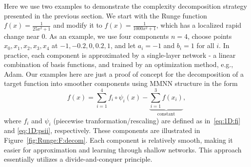 \documentclass[review,hidelinks,onefignum,onetabnum]{siamart250211}
\begin{document}
Here we use two examples to demonstrate the complexity decomposition strategy presented in the previous section. We start with the Runge function $f(x) = \frac{1}{25x^2+1}$ and modify it to $f(x) = \frac{1}{1000x^2+1}$, which has a localized rapid change near $0$. As an example, we use four components $n=4$, choose points $x_0, x_1, x_2, x_3, x_4$ at $-1, -0.2, 0, 0.2, 1$, and let $a_i = -1$ and $b_i = 1$ for all 
 $i$. In practice, each component is approximated by a single-layer network - a linear combination of basis functions, and trained by an optimization method, e.g., Adam. Our examples here are just a proof of concept for the decomposition of a target function into smoother components using MMNN structure in the form
\[
f(x) = \sum_{i=1}^4 f_i\circ \psi_i(x) - \underbrace{\sum_{i=1}^{3} f(x_i)}_{\text{constant}},
\]
where $f_i$ and $\psi_i$ (piecewise tranformation/rescaling) are defined as in~\eqref{eq:1D:fi} and \eqref{eq:1D:psii}, respectively. These components are illustrated in Figure~\ref{fig:Runge:F:decom}.
Each component is relatively smooth, making it easier for approximation and learning through shallow networks. This approach essentially utilizes a divide-and-conquer principle.
\end{document}
